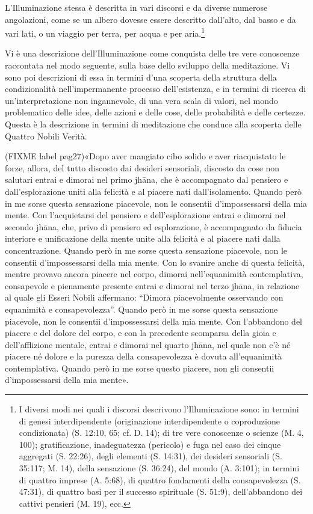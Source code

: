  L’Illuminazione stessa è descritta in vari discorsi e
da diverse numerose angolazioni, come se un albero dovesse essere
descritto dall’alto, dal basso e da vari lati, o un viaggio per terra,
per acqua e per aria.\footnote{I diversi modi nei quali i discorsi descrivono l’Illuminazione sono: in termini di genesi interdipendente (originazione interdipendente o coproduzione condizionata) (S. 12:10, 65; cf. D. 14); di tre vere conoscenze o scienze (M. 4, 100); gratificazione, inadeguatezza (pericolo) e fuga nel caso dei cinque aggregati (S. 22:26), degli elementi (S. 14:31), dei desideri sensoriali (S. 35:117; M. 14), della sensazione (S. 36:24), del mondo (A. 3:101); in termini di quattro imprese (A. 5:68), di quattro fondamenti della consapevolezza (S. 47:31), di quattro basi per il successo spirituale (S. 51:9), dell’abbandono dei cattivi pensieri (M. 19), ecc.}


 Vi è una descrizione dell’Illuminazione come
conquista delle tre vere conoscenze raccontata nel modo seguente, sulla
base dello sviluppo della meditazione. Vi sono poi descrizioni di essa
in termini d’una scoperta della struttura della condizionalità
nell’impermanente processo dell’esistenza, e in termini di ricerca di
un’interpretazione non ingannevole, di una vera scala di valori, nel
mondo problematico delle idee, delle azioni e delle cose, delle
probabilità e delle certezze. Questa è la descrizione in termini di
meditazione che conduce alla scoperta delle Quattro Nobili Verità.


 (FIXME label pag27)«Dopo aver mangiato cibo solido e aver riacquistato le
forze, allora, del tutto discosto dai desideri sensoriali, discosto da
cose non salutari entrai e dimorai nel primo jhāna, che è accompagnato
dal pensiero e dall’esplorazione uniti alla felicità e al piacere nati
dall’isolamento. Quando però in me sorse questa sensazione piacevole,
non le consentii d’impossessarsi della mia mente. Con l’acquietarsi del
pensiero e dell’esplorazione entrai e dimorai nel secondo jhāna, che,
privo di pensiero ed esplorazione, è accompagnato da fiducia interiore e
unificazione della mente unite alla felicità e al piacere nati dalla
concentrazione. Quando però in me sorse questa sensazione piacevole, non
le consentii d’impossessarsi della mia mente. Con lo svanire anche di
questa felicità, mentre provavo ancora piacere nel corpo, dimorai
nell’equanimità contemplativa, consapevole e pienamente presente entrai
e dimorai nel terzo jhāna, in relazione al quale gli Esseri Nobili
affermano: “Dimora piacevolmente osservando con equanimità e
consapevolezza”. Quando però in me sorse questa sensazione piacevole,
non le consentii d’impossessarsi della mia mente. Con l’abbandono del
piacere e del dolore del corpo, e con la precedente scomparsa della
gioia e dell’afflizione mentale, entrai e dimorai nel quarto jhāna, nel
quale non c’è né piacere né dolore e la purezza della consapevolezza è
dovuta all’equanimità contemplativa. Quando però in me sorse questo
piacere, non gli consentii d’impossessarsi della mia mente».


